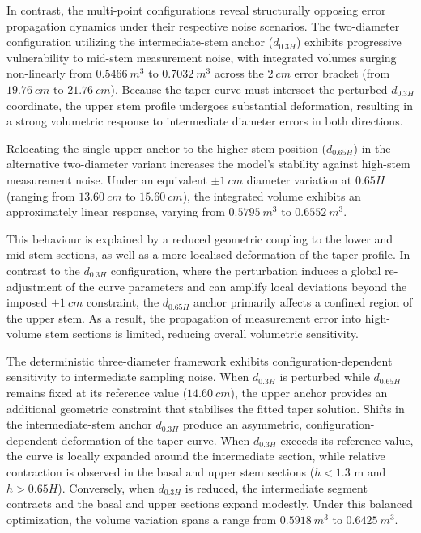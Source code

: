 \documentclass[twocolumn, bibliography=totoc]{scrartcl}
\begin{document}
In contrast, the multi-point configurations reveal structurally opposing error propagation dynamics under their respective noise scenarios. The two-diameter configuration utilizing the intermediate-stem anchor ($d_{0.3H}$) exhibits progressive vulnerability to mid-stem measurement noise, with integrated volumes surging non-linearly from $\qty{0.5466}{m^3}$ to $\qty{0.7032}{m^3}$ across the $\qty{2}{cm}$ error bracket (from $\qty{19.76}{cm}$ to $\qty{21.76}{cm}$). Because the taper curve must intersect the perturbed $d_{0.3H}$ coordinate, the upper stem profile undergoes substantial deformation, resulting in a strong volumetric response to intermediate diameter errors in both directions.

Relocating the single upper anchor to the higher stem position ($d_{0.65H}$) in the alternative two-diameter variant increases the model's stability against high-stem measurement noise. Under an equivalent $\pm\qty{1}{cm}$ diameter variation at $0.65H$ (ranging from $\qty{13.60}{cm}$ to $\qty{15.60}{cm}$), the integrated volume exhibits an approximately linear response, varying from $\qty{0.5795}{m^3}$ to $\qty{0.6552}{m^3}$.

This behaviour is explained by a reduced geometric coupling to the lower and mid-stem sections, as well as a more localised deformation of the taper profile. In contrast to the $d_{0.3H}$ configuration, where the perturbation induces a global re-adjustment of the curve parameters and can amplify local deviations beyond the imposed $\pm\qty{1}{cm}$ constraint, the $d_{0.65H}$ anchor primarily affects a confined region of the upper stem. As a result, the propagation of measurement error into high-volume stem sections is limited, reducing overall volumetric sensitivity.

The deterministic three-diameter framework exhibits configuration-dependent sensitivity to intermediate sampling noise. When $d_{0.3H}$ is perturbed while $d_{0.65H}$ remains fixed at its reference value ($\qty{14.60}{cm}$), the upper anchor provides an additional geometric constraint that stabilises the fitted taper solution. Shifts in the intermediate-stem anchor $d_{0.3H}$ produce an asymmetric, configuration-dependent deformation of the taper curve. When $d_{0.3H}$ exceeds its reference value, the curve is locally expanded around the intermediate section, while relative contraction is observed in the basal and upper stem sections ($h < 1.3\text{ m}$ and $h > 0.65H$). Conversely, when $d_{0.3H}$ is reduced, the intermediate segment contracts and the basal and upper sections expand modestly. Under this balanced optimization, the volume variation spans a range from $\qty{0.5918}{m^3}$ to $\qty{0.6425}{m^3}$.
\end{document}
